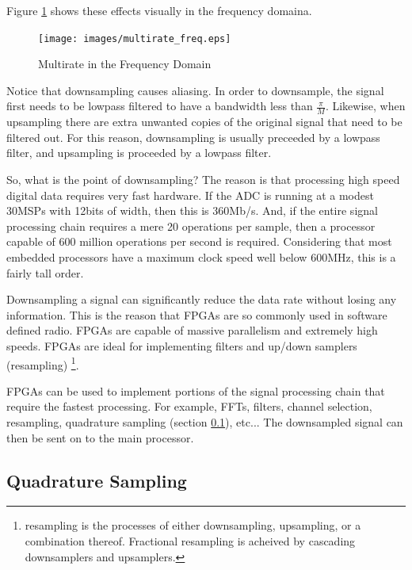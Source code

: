 \documentclass[a4paper, 12pt]{article}
\begin{document}
Figure \ref{fig:multirate_freq} shows these effects visually in the frequency domaina.

\begin{figure}[h]
\caption{Multirate in the Frequency Domain}
\label{fig:multirate_freq}
\centering
\texttt{[image: images/multirate\_freq.eps]}
\end{figure}

Notice that downsampling causes aliasing.  In order to downsample, the signal first needs to be lowpass filtered to have a bandwidth less than $\frac{\pi}{M}$.  Likewise, when upsampling there are extra unwanted copies of the original signal that need to be filtered out.  For this reason, downsampling is usually preceeded by a lowpass filter, and upsampling is proceeded by a lowpass filter.

So, what is the point of downsampling?  The reason is that processing high speed digital data requires very fast hardware.  If the ADC is running at a modest 30MSPs with 12bits of width, then this is 360Mb/s.  And, if the entire signal processing chain requires a mere 20 operations per sample, then a processor capable of 600 million operations per second is required.  Considering that most embedded processors have a maximum clock speed well below 600MHz, this is a fairly tall order.

Downsampling a signal can significantly reduce the data rate without losing any information.  This is the reason that FPGAs are so commonly used in software defined radio.  FPGAs are capable of massive parallelism and extremely high speeds.  FPGAs are ideal for implementing filters and up/down samplers (resampling) \footnote{resampling is the processes of either downsampling, upsampling, or a combination thereof.  Fractional resampling is acheived by cascading downsamplers and upsamplers.}.

FPGAs can be used to implement portions of the signal processing chain that require the fastest processing.  For example, FFTs, filters, channel selection, resampling, quadrature sampling (section \ref{sec:quadrature_sampling}), etc...  The downsampled signal can then be sent on to the main processor.


\subsection{Quadrature Sampling}
\label{sec:quadrature_sampling}

\clearpage


\end{document}
